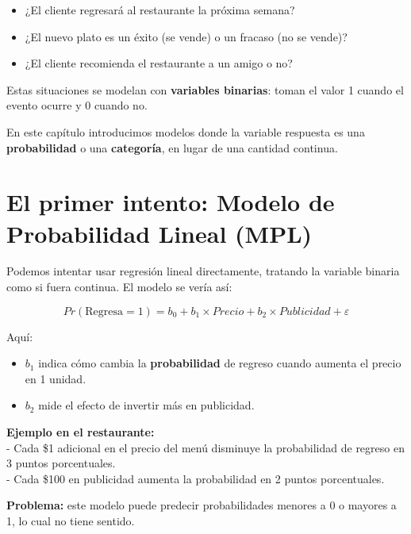 \documentclass[
  spanish,
  letterpaper,
  DIV=11,
  numbers=noendperiod]{scrreprt}
\providecommand{\tightlist}{%
  \setlength{\itemsep}{0pt}\setlength{\parskip}{0pt}}
\begin{document}
\begin{itemize}
\tightlist
\item
  ¿El cliente regresará al restaurante la próxima semana?\\
\item
  ¿El nuevo plato es un éxito (se vende) o un fracaso (no se vende)?\\
\item
  ¿El cliente recomienda el restaurante a un amigo o no?
\end{itemize}

Estas situaciones se modelan con \textbf{variables binarias}: toman el
valor 1 cuando el evento ocurre y 0 cuando no.

En este capítulo introducimos modelos donde la variable respuesta es una
\textbf{probabilidad} o una \textbf{categoría}, en lugar de una cantidad
continua.

\section{El primer intento: Modelo de Probabilidad Lineal
(MPL)}\label{el-primer-intento-modelo-de-probabilidad-lineal-mpl}

Podemos intentar usar regresión lineal directamente, tratando la
variable binaria como si fuera continua. El modelo se vería así:

\[
Pr(\text{Regresa}=1) = b_0 + b_1 \times Precio + b_2 \times Publicidad + \varepsilon
\]

Aquí:

\begin{itemize}
\tightlist
\item
  \(b_1\) indica cómo cambia la \textbf{probabilidad} de regreso cuando
  aumenta el precio en 1 unidad.\\
\item
  \(b_2\) mide el efecto de invertir más en publicidad.
\end{itemize}

\textbf{Ejemplo en el restaurante:}\\
- Cada \$1 adicional en el precio del menú disminuye la probabilidad de
regreso en 3 puntos porcentuales.\\
- Cada \$100 en publicidad aumenta la probabilidad en 2 puntos
porcentuales.

\begin{tcolorbox}[enhanced jigsaw, toptitle=1mm, opacitybacktitle=0.6, leftrule=.75mm, arc=.35mm, title=\textcolor{quarto-callout-warning-color}{\faExclamationTriangle}\hspace{0.5em}{Advertencia}, colback=white, bottomrule=.15mm, colbacktitle=quarto-callout-warning-color!10!white, opacityback=0, bottomtitle=1mm, breakable, rightrule=.15mm, coltitle=black, left=2mm, titlerule=0mm, colframe=quarto-callout-warning-color-frame, toprule=.15mm]

\textbf{Problema:} este modelo puede predecir probabilidades menores a 0
o mayores a 1, lo cual no tiene sentido.

\end{tcolorbox}
\end{document}
